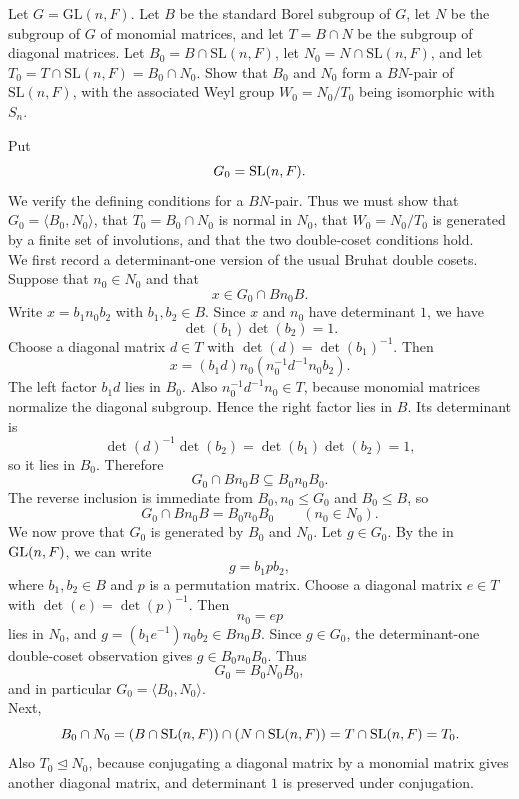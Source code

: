 \documentclass[../Odyssey_Project.tex]{subfiles}
\begin{document}
\begin{exercise}
\label{ex:6.10}
Let $G = \mathrm{GL}(n,F)$. Let $B$ be the standard Borel subgroup of $G$, let $N$ be the subgroup of $G$ of monomial matrices, and let $T = B \cap N$ be the subgroup of diagonal matrices. Let $B_0 = B \cap \mathrm{SL}(n,F)$, let $N_0 = N \cap \mathrm{SL}(n,F)$, and let $T_0 = T \cap \mathrm{SL}(n,F) = B_0 \cap N_0$. Show that $B_0$ and $N_0$ form a $BN$-pair of $\mathrm{SL}(n,F)$, with the associated Weyl group $W_0 = N_0/T_0$ being isomorphic with $S_n$.
\end{exercise}
\begin{solution}
Put
\[
    G_0=\operatorname{SL}(n,F).
\]
We verify the defining conditions for a $BN$-pair. Thus we must show that $G_0=\langle B_0,N_0\rangle$, that $T_0=B_0\cap N_0$ is normal in $N_0$, that $W_0=N_0/T_0$ is generated by a finite set of involutions, and that the two double-coset conditions hold.\\
We first record a determinant-one version of the usual Bruhat double cosets. Suppose that $n_0\in N_0$ and that
\[
    x\in G_0\cap Bn_0B.
\]
Write $x=b_1n_0b_2$ with $b_1,b_2\in B$. Since $x$ and $n_0$ have determinant $1$, we have
\[
    \det(b_1)\det(b_2)=1.
\]
Choose a diagonal matrix $d\in T$ with $\det(d)=\det(b_1)^{-1}$. Then
\[
    x=(b_1d)n_0(n_0^{-1}d^{-1}n_0b_2).
\]
The left factor $b_1d$ lies in $B_0$. Also $n_0^{-1}d^{-1}n_0\in T$, because monomial matrices normalize the diagonal subgroup. Hence the right factor lies in $B$. Its determinant is
\[
    \det(d)^{-1}\det(b_2)
    =
    \det(b_1)\det(b_2)
    =
    1,
\]
so it lies in $B_0$. Therefore
\[
    G_0\cap Bn_0B\subseteq B_0n_0B_0.
\]
The reverse inclusion is immediate from $B_0,n_0\leq G_0$ and $B_0\leq B$, so
\[
    G_0\cap Bn_0B=B_0n_0B_0
    \qquad(n_0\in N_0).
\]
We now prove that $G_0$ is generated by $B_0$ and $N_0$. Let $g\in G_0$. By the  in $\operatorname{GL}(n,F)$, we can write
\[
    g=b_1pb_2,
\]
where $b_1,b_2\in B$ and $p$ is a permutation matrix. Choose a diagonal matrix $e\in T$ with $\det(e)=\det(p)^{-1}$. Then
\[
    n_0=ep
\]
lies in $N_0$, and $g=(b_1e^{-1})n_0b_2\in Bn_0B$. Since $g\in G_0$, the determinant-one double-coset observation gives $g\in B_0n_0B_0$. Thus
\[
    G_0=B_0N_0B_0,
\]
and in particular $G_0=\langle B_0,N_0\rangle$.\\
Next,
\[
    B_0\cap N_0
    =
    (B\cap \operatorname{SL}(n,F))\cap(N\cap \operatorname{SL}(n,F))
    =
    T\cap\operatorname{SL}(n,F)
    =
    T_0.
\]
Also $T_0\trianglelefteq N_0$, because conjugating a diagonal matrix by a monomial matrix gives another diagonal matrix, and determinant $1$ is preserved under conjugation.\\

\end{solution}
\end{document}
